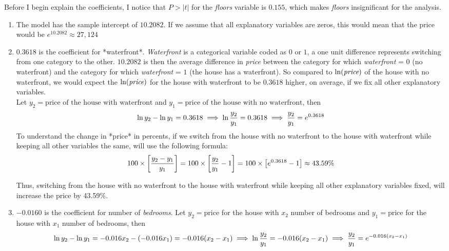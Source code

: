 \documentclass[10pt]{article}
\begin{document}
 Before I begin explain the coefficients, I notice that $P>|t|$ for the {\it floors} variable is $0.155$, which makes  {\it floors} insignificant for the analysis. 
 \begin{enumerate}
 	\item  The model has the sample intercept of $10.2082$.
If we assume that all explanatory variables are zeros, this would mean that the price would be $e^{10.2082}\approx 27,124$
 \item  $0.3618$ is the coefficient for *waterfront*.
 {\it Waterfront} is a categorical variable coded as $0$ or $1$, a one unit difference represents switching from one category to the other. $10.2082$ is then the average difference in  {\it price} between the category for which  {\it waterfront} = \(0\) (no waterfront) and the category for which  {\it waterfront} = \(1\) (the house has a waterfront). So compared to $\ln(\text{\it price})$ of the house with no waterfront, we would expect the $\ln(\text{\it price})$ for the house with waterfront to be $0.3618$ higher, on average, if we fix all other explanatory variables.\\
Let $y_2 = \text{price of the house with waterfront}$   and $y_1 = \text{price of the house with no waterfront}$, then 
$$
\large
\ln y_2 - \ln y_1 = 0.3618 \implies \ln \frac{y_2}{y_1} = 0.3618 \implies \frac{y_2}{y_1} = e^{0.3618}$$
To understand the change in *price* in percents, if we switch from the house with no waterfront to the house with waterfront while keeping all other variables the same, will use the following formula:
$$
\large
100\times \left[\frac{y_2-y_1}{y_1}\right]= 100\times \left[\frac{y_2}{y_1} - 1\right] = 100\times \left[ e^{0.3618} - 1\right] \approx 43.59\%$$

Thus, switching from the house with no waterfront to the house with waterfront while keeping all other explanatory variables fixed, will increase the price by 43.59\%.

 \item  $-0.0160$ is the coefficient for number of {\it bedrooms}. Let $y_2 = \text{price}$ for the house with $x_2$ number of bedrooms and $y_1 = \text{price}$ for the house with $x_1$ number of bedrooms, then 
$$
\large
\ln y_2 - \ln y_1 = -0.016 x_2 - (-0.016 x_1) = -0.016 (x_2 - x_1) \implies \ln\frac{y_2}{y_1} = -0.016 (x_2-x_1)\implies \frac{y_2}{y_1} = e^{-0.016(x_2-x_1)}$$


\end{enumerate}
\end{document}
